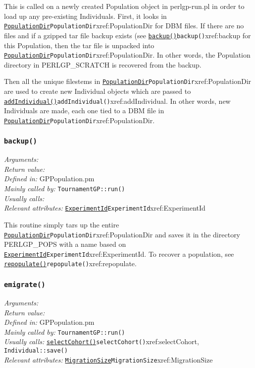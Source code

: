 \documentclass[a4paper]{article}
\begin{document}
This is called on a newly created Population object in perlgp-run.pl
in order to load up any pre-existing Individuals.  First, it looks in
\hyperref[no]{\texttt{PopulationDir}}{\texttt{PopulationDir}}{xref:PopulationDir} for DBM files.  If there are no files and if a
gzipped tar file backup exists (see \hyperref[no]{\texttt{backup()}}{\texttt{backup()}}{xref:backup} for this
Population, then the tar file is unpacked into \hyperref[no]{\texttt{PopulationDir}}{\texttt{PopulationDir}}{xref:PopulationDir}.
In other words, the Population directory in PERLGP\_SCRATCH is
recovered from the backup.

Then all the unique filestems in \hyperref[no]{\texttt{PopulationDir}}{\texttt{PopulationDir}}{xref:PopulationDir} are used to
create new Individual objects which are passed to
\hyperref[no]{\texttt{addIndividual()}}{\texttt{addIndividual()}}{xref:addIndividual}.  In other words, new Individuals are made,
each one tied to a DBM file in \hyperref[no]{\texttt{PopulationDir}}{\texttt{PopulationDir}}{xref:PopulationDir}.

\subsubsection{\texttt{backup()}}\label{xref:backup}
\begin{flushleft}
\textit{Arguments:} \\
\textit{Return value:} \\
\textit{Defined in:} GPPopulation.pm\\
\textit{Mainly called by:} \texttt{TournamentGP::run()}\\
\textit{Usually calls:} \\
\textit{Relevant attributes:} \hyperref[no]{\texttt{ExperimentId}}{\texttt{ExperimentId}}{xref:ExperimentId}
\end{flushleft}

This routine simply tars up the entire \hyperref[no]{\texttt{PopulationDir}}{\texttt{PopulationDir}}{xref:PopulationDir} and
saves it in the directory PERLGP\_POPS with a name based on
\hyperref[no]{\texttt{ExperimentId}}{\texttt{ExperimentId}}{xref:ExperimentId}.  To recover a population, see
\hyperref[no]{\texttt{repopulate()}}{\texttt{repopulate()}}{xref:repopulate}.

\subsubsection{\texttt{emigrate()}}\label{xref:emigrate}
\begin{flushleft}
\textit{Arguments:} \\
\textit{Return value:} \\
\textit{Defined in:} GPPopulation.pm\\
\textit{Mainly called by:} \texttt{TournamentGP::run()}\\
\textit{Usually calls:} \hyperref[no]{\texttt{selectCohort()}}{\texttt{selectCohort()}}{xref:selectCohort}, \texttt{Individual::save()}\\
\textit{Relevant attributes:} \hyperref[no]{\texttt{MigrationSize}}{\texttt{MigrationSize}}{xref:MigrationSize}
\end{flushleft}
\end{document}
